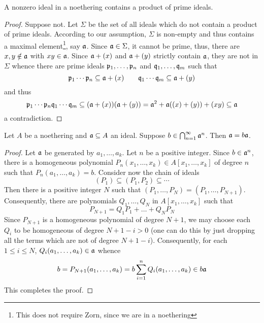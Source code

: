\begin{proposition}
    A nonzero ideal in a noethering contains a product of prime ideals.
\end{proposition}
\begin{proof}
    Suppose not. Let $\Sigma$ be the set of all ideals which do not contain a product of prime ideals. According to our assumption, $\Sigma$ is non-empty and thus contains a maximal element\footnote{This does not require Zorn, since we are in a noethering}, say $\mathfrak a$. Since $\mathfrak a\in\Sigma$, it cannot be prime, thus, there are $x,y\notin\mathfrak a$ with $xy\in\mathfrak a$. Since $\mathfrak a + (x)$ and $\mathfrak a + (y)$ strictly contain $\mathfrak a$, they are not in $\Sigma$ whence there are prime ideals $\mathfrak p_1,\ldots,\mathfrak p_n$ and $\mathfrak q_1,\ldots,\mathfrak q_m$ such that 
    \begin{equation*}
        \mathfrak p_1\cdots\mathfrak p_n\subseteq\mathfrak a + (x)\qquad\mathfrak q_1\cdots\mathfrak q_m\subseteq\mathfrak a + (y)
    \end{equation*}
    and thus
    \begin{equation*}
        \mathfrak p_1\cdots\mathfrak p_n\mathfrak q_1\cdots\mathfrak q_m\subseteq(\mathfrak a + (x))(\mathfrak a + (y)) = \mathfrak a^2 + \mathfrak a((x) + (y)) + (xy)\subseteq\mathfrak a
    \end{equation*}
    a contradiction.
\end{proof}

\begin{lemma}
    Let $A$ be a noethering and $\mathfrak a\subseteq A$ an ideal. Suppose $b\in\bigcap_{n = 1}^\infty\mathfrak a^n$. Then $\mathfrak a = b\mathfrak a$.
\end{lemma}
\begin{proof}
    Let $\mathfrak a$ be generated by $a_1,\dots,a_k$. Let $n$ be a positive integer. Since $b\in\mathfrak a^n$, there is a homogeneous polynomial $P_n(x_1,\ldots,x_k)\in A[x_1,\dots,x_k]$ of degree $n$ such that $P_n(a_1,\dots,a_k) = b$. Consider now the chain of ideals 
    \begin{equation*}
        (P_1)\subseteq(P_1,P_2)\subseteq\cdots
    \end{equation*}
    Then there is a positive integer $N$ such that $(P_1,\dots,P_N) = (P_1,\dots,P_{N + 1})$. Consequently, there are polynomials $Q_1,\dots,Q_N$ in $A[x_1,\dots,x_k]$ such that 
    \begin{equation*}
        P_{N + 1} = Q_1P_1 + \dots + Q_NP_N
    \end{equation*}
    Since $P_{N + 1}$ is a homogeneous polynomial of degree $N + 1$, we may choose each $Q_i$ to be homogeneous of degree $N + 1 - i > 0$ (one can do this by just dropping all the terms which are not of degree $N + 1 - i$). Consequently, for each $1\le i\le N$, $Q_i(a_1,\dots,a_k)\in\mathfrak a$ whence 
    \begin{equation*}
        b = P_{N + 1}(a_1,\dots,a_k) = b\sum_{i = 1}^nQ_i(a_1,\dots,a_k)\in b\mathfrak a
    \end{equation*}
    This completes the proof.
\end{proof}

